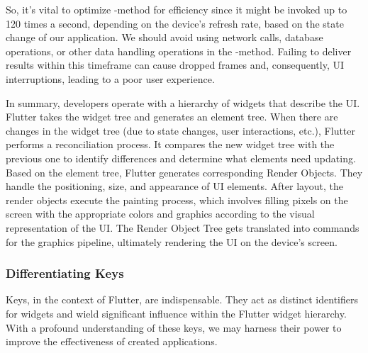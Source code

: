 So, it's vital to optimize -method for efficiency since it might be invoked up to 120 times a second, depending 
on the device's refresh rate, based on the state change of our application. We should avoid using network calls, 
database operations, or other data handling operations in the -method. Failing to deliver results within this 
timeframe can cause dropped frames and, consequently, UI interruptions, leading to a poor user experience.

In summary, developers operate with a hierarchy of widgets that describe the UI. Flutter takes the widget tree and 
generates an element tree. When there are changes in the widget tree (due to state changes, user interactions, etc.), 
Flutter performs a reconciliation process. It compares the new widget tree with the previous one to identify differences 
and determine what elements need updating. Based on the element tree, Flutter generates corresponding Render Objects.
They handle the positioning, size, and appearance of UI elements. After layout, the render objects execute the painting 
process, which involves filling pixels on the screen with the appropriate colors and graphics according to the visual 
representation of the UI. The Render Object Tree gets translated into commands for the graphics pipeline, ultimately 
rendering the UI on the device's screen.



\newpage
\subsubsection{Differentiating Keys}

Keys, in the context of Flutter, are indispensable. They act as distinct identifiers for widgets and wield significant 
influence within the Flutter widget hierarchy. With a profound understanding of these keys, we may harness their power 
to improve the effectiveness of created applications.

